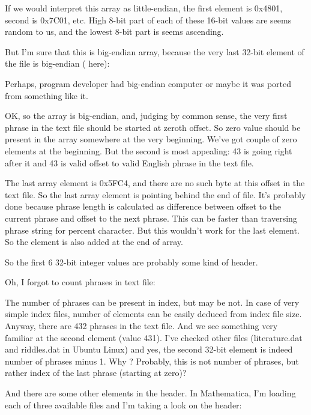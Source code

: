 

If we would interpret this array as little-endian, the first element is 0x4801, second is 0x7C01, etc.
High 8-bit part of each of these 16-bit values are seems random to us, and the lowest 8-bit part is seems ascending.

But I'm sure that this is big-endian array, because the very last 32-bit element of the file is big-endian 
( here):



Perhaps,  program developer had big-endian computer or maybe it was ported from something like it.

OK, so the array is big-endian, and, judging by common sense, the very first phrase in the text file should be started at zeroth offset. So zero value should be present in the array somewhere at the very beginning.
We've got couple of zero elements at the beginning. But the second is most appealing: 43 is going right after it and 43 is valid offset to valid English phrase in the text file.

The last array element is 0x5FC4, and there are no such byte at this offset in the text file.
So the last array element is pointing behind the end of file.
It's probably done because phrase length is calculated as difference between offset to the current phrase
and offset to the next phrase. 
This can be faster than traversing phrase string for percent character.
But this wouldn't work for the last element.
So the  element is also added at the end of array.

So the first 6 32-bit integer values are probably some kind of header.

Oh, I forgot to count phrases in text file:



The number of phrases can be present in index, but may be not.
In case of very simple index files, number of elements can be easily deduced from index file size.
Anyway, there are 432 phrases in the text file.
And we see something very familiar at the second element (value 431).
I've checked other files (literature.dat and riddles.dat in Ubuntu Linux) and yes, the second 32-bit element is indeed number of phrases minus 1.
Why ? Probably, this is not number of phrases, but rather index of the last phrase (starting at zero)?

And there are some other elements in the header.
In Mathematica, I'm loading each of three available files and I'm taking a look on the header:

